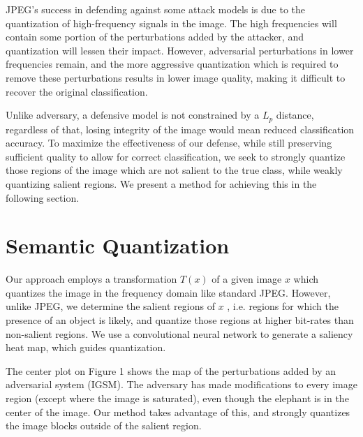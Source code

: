 JPEG's success in defending against some attack models is due to the quantization of high-frequency signals in the image.
The high frequencies will contain some portion of the perturbations added by the attacker, and quantization will lessen their impact.
However, adversarial perturbations in lower frequencies remain, and the more aggressive quantization which is required to remove these perturbations results in lower image quality, making it difficult to recover the original classification.

 
Unlike adversary, a defensive model is not constrained by a $L_p$ distance, regardless of that, losing integrity of the image would mean reduced classification accuracy.
To maximize the effectiveness of our defense, while still preserving sufficient quality to allow for correct classification, we seek to strongly quantize those regions of the image which are not salient to the true class, while weakly quantizing salient regions.
We present a method for achieving this in the following section.

\section{Semantic Quantization}

Our approach employs a transformation $T(x)$ of a given image $x$ which quantizes the image in the frequency domain like standard JPEG.
However, unlike JPEG, we determine the salient regions of $x$ , i.e. regions for which the presence of an object is likely, and quantize those regions at higher bit-rates than non-salient regions.
We use a convolutional neural network to generate a saliency heat map, %
which guides quantization.

The center plot on Figure 1 shows the map of the perturbations added by an adversarial system (IGSM). The adversary has made modifications to every image region (except where the image is saturated), even though the elephant is in the center of the image. Our method takes advantage of this, and strongly quantizes the image blocks outside of the salient region. %

